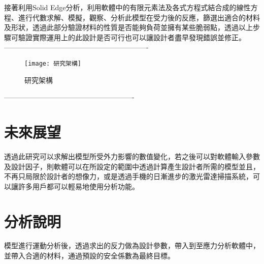接著利用Solid Edge分析，利用軟體中的有限元素法及各式方程式結合成的線性方程、進行代數求解、模擬，觀察、分析此模型在受力後的反應，篩選出適合的材料及形狀，透過此部分驗證材料的性質是否能夠負荷並擁有某些脆弱點，透過以上步驟可驗證實際運用上的此設計是否可行也可以讓設計者盡早發現錯誤並修正。\\
 -------------------------------------------------------------
\begin{figure}[hbt!]
\begin{center}
\texttt{[image: 研究架構]}
\caption{\Large 研究架構 }
\label{研究架構 }
\end{center}
\end{figure}
-------------------------------------------------------

\section{未來展望}

透過此研究可以求解出模型所受外力影響的數值變化，若之後可以對軟體輸入參數及設計因子，則軟體可以在所設定的範圍中透過計算產生設計者所需的模型並且，不再只局限於設計者的想像力，或是透過手機的日漸進步的激光雷達掃描系統，可以讓許多用戶都可以輕易地使用分析功能。\\

\section{分析說明}

模型進行運動分析後，透過求出的反力做為設計參數，帶入到至應力分析軟體中，並帶入合適的材料，通過預設的安全係數為最終目標。\\

\renewcommand{\baselinestretch}{0.5} %
